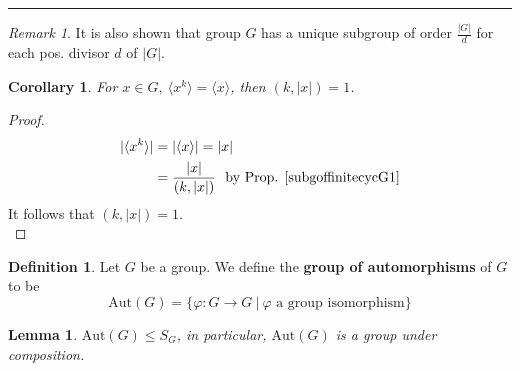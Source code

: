 \documentclass{article}
\newtheorem{corollary}{Corollary}[theorem]
\newtheorem{lemma}[theorem]{Lemma}
\theoremstyle{definition}
\newtheorem{definition}{Definition}[section]
\theoremstyle{remark}
\newtheorem*{remark}{Remark}
\begin{document}
\hrule
\vspace{2mm}
\begin{remark}
	It is also shown that group $G$ has a unique subgroup of order $\frac{|G|}{d}$ for each pos. divisor $d$ of $|G|$.\\
\end{remark}
\begin{corollary}
	For $x\in G,~\langle x^k\rangle =\langle x\rangle$, then $(k,|x|)=1$.\\
\end{corollary}
\begin{proof}
	\begin{align*}
		|\langle x^k\rangle| & =|\langle x\rangle|=|x|                                       \\
		                     & =\frac{|x|}{(k,|x|)}~\text{ by Prop. \ref{subgoffinitecycG1}}
	\end{align*}
	It follows that $(k,|x|)=1$.\\
\end{proof}
\begin{definition}
	Let $G$ be a group. We define the \textbf{group of automorphisms} of $G$ to be
	\begin{equation}
		\mathrm{Aut}(G)=\lbrace \varphi:G\rightarrow G~|~\varphi \text{ a group isomorphism}\rbrace
	\end{equation}
\end{definition}
\begin{lemma}
	$\mathrm{Aut}(G)\leq S_G$, in particular, $\mathrm{Aut}(G)$ is a group under composition.\\
\end{lemma}
\end{document}
